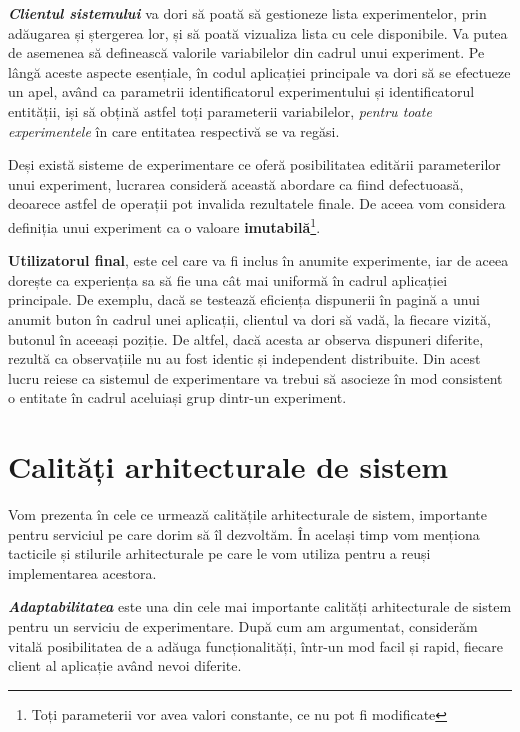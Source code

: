 \textbf{\textit{Clientul sistemului}} va dori să poată să gestioneze lista experimentelor, prin adăugarea și ștergerea lor, și să poată vizualiza lista cu cele disponibile. Va putea de asemenea să definească valorile variabilelor din cadrul unui experiment. Pe lângă aceste aspecte esențiale, în codul aplicației principale va dori să se efectueze un apel, având ca parametrii identificatorul experimentului și identificatorul entității, iși să obțină astfel toți parameterii variabilelor, \textit{pentru toate experimentele} în care entitatea respectivă se va regăsi.

\begin{remark}
	\label{remark:no_edit_exp}
	Deși există sisteme de experimentare ce oferă posibilitatea editării parameterilor unui experiment, lucrarea consideră această abordare ca fiind defectuoasă, deoarece astfel de operații pot invalida rezultatele finale. De aceea vom considera definiția unui experiment ca o valoare \textbf{imutabilă}\footnote{Toți parameterii vor avea valori constante, ce nu pot fi modificate}. 
\end{remark}

\textbf{\textbf{Utilizatorul final}}, este cel care va fi inclus în anumite experimente, iar de aceea dorește ca experiența sa să fie una cât mai uniformă în cadrul aplicației principale. De exemplu, dacă se testează eficiența dispunerii în pagină a unui anumit buton în cadrul unei aplicații, clientul va dori să vadă, la fiecare vizită, butonul în aceeași poziție. De altfel, dacă acesta ar observa dispuneri diferite, rezultă ca observațiile nu au fost identic și independent distribuite. Din acest lucru reiese ca sistemul de experimentare va trebui să asocieze în mod consistent o entitate în cadrul aceluiași grup dintr-un experiment. 

\section{Calități arhitecturale de sistem}

Vom prezenta în cele ce urmează calitățile arhitecturale de sistem, importante pentru serviciul pe care dorim să îl dezvoltăm. În același timp vom menționa tacticile și stilurile arhitecturale pe care le vom utiliza pentru a reuși implementarea acestora.

\textbf{\textit{Adaptabilitatea}} este una din cele mai importante calități arhitecturale de sistem pentru un serviciu de experimentare. După cum am argumentat, considerăm vitală posibilitatea de a adăuga funcționalități, într-un mod facil și rapid, fiecare client al aplicație având nevoi diferite.

